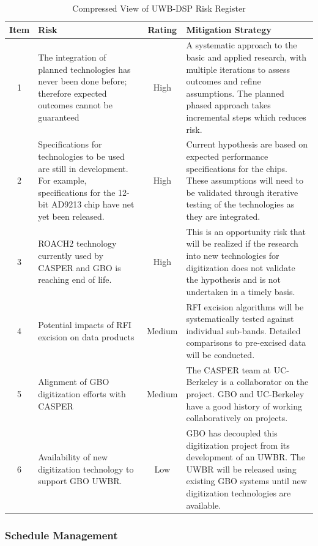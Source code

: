 \documentclass[10pt]{myNSF}
\begin{document}
\begin{table}[t]
  \centering
  \caption{Compressed View of UWB-DSP Risk Register \label{table:risk_register}}
  \begin{tabular}{|c|p{2.5in}|c|p{2.5in}|}
    \hline
    Item & Risk & Rating & Mitigation Strategy \\
    \hline
    1 & The integration of planned technologies has never been done before; therefore expected outcomes cannot be guaranteed & High & A systematic approach to the basic and applied research, with multiple iterations to assess outcomes and refine assumptions.  The planned phased approach takes incremental steps which reduces risk. \\
    \hline
    2 & Specifications for technologies to be used are still in development.  For example, specifications for the 12-bit AD9213 chip have net yet been released. & High & Current hypothesis are based on expected performance specifications for the chips.  These assumptions will need to be validated through iterative testing of the technologies as they are integrated. \\
    \hline
    3 & ROACH2 technology currently used by CASPER and GBO is reaching end of life. & High & This is an opportunity risk that will be realized if the research into new technologies for digitization does not validate the hypothesis and is not undertaken in a timely basis. \\
    \hline
    4 & Potential impacts of RFI excision on data products & Medium & RFI excision algorithms will be systematically tested against individual sub-bands.  Detailed comparisons to pre-excised data will be conducted. \\
    \hline
    5 & Alignment of GBO digitization efforts with CASPER & Medium & The CASPER team at UC-Berkeley is a collaborator on the project.  GBO and UC-Berkeley have a good history of working collaboratively on projects. \\
    \hline
    6 & Availability of new digitization technology to support GBO UWBR. & Low & GBO has decoupled this digitization project from its development of an UWBR.  The UWBR will be released using existing GBO systems until new digitization technologies are available. \\
    \hline
  \end{tabular}
\end{table}

\subsubsection{Schedule Management}
\label{sec:schedule}
\end{document}
